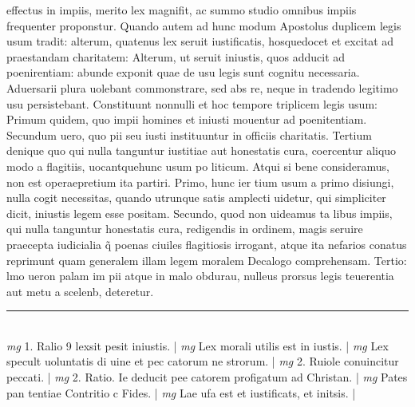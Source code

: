 \documentclass{article}
\begin{document}
\begin{pages}
effectus in impiis, merito lex magnifit, ac summo studio omnibus impiis frequenter proponstur. Quando autem ad hunc modum Apostolus duplicem legis usum tradit: alterum, quatenus lex seruit iustificatis, hosquedocet et excitat ad praestandam charitatem: Alterum, ut seruit iniustis, quos adducit ad poenirentiam: abunde exponit quae de usu legis sunt cognitu necessaria. Aduersarii plura uolebant commonstrare, sed abs re, neque  in tradendo legitimo usu persistebant. Constituunt nonnulli et hoc tempore triplicem legis usum: Primum quidem, quo impii homines et iniusti mouentur ad poenitentiam. Secundum uero, quo pii seu iusti instituuntur in officiis charitatis. Tertium denique  quo qui nulla tanguntur iustitiae aut honestatis cura, coercentur aliquo modo a flagitiis, uocantquehunc usum po liticum. Atqui si bene consideramus, non est operaepretium ita partiri. Primo, hunc ier tium usum a primo disiungi, nulla cogit necessitas, quando utrunque  satis amplecti uidetur, qui simpliciter dicit, iniustis legem esse positam. Secundo, quod non uideamus ta libus impiis, qui nulla tanguntur honestatis cura, redigendis in ordinem, magis seruire praecepta iudicialia q̃ poenas ciuiles flagitiosis irrogant, atque  ita nefarios conatus reprimunt quam generalem illam legem moralem Decalogo comprehensam. Tertio: lmo ueron palam im pii atque  in malo obdurau, nulleus prorsus legis teuerentia aut metu a scelenb, deteretur.  \pend
\vspace{0.5cm}\noindent
\vspace{0.2cm}\rule{1cm}{0.2pt}\\ 
\hspace{0.2cm}\textit{mg}
\footnotesize 1. Ralio 9 lexsit pesit iniustis. 
\normalsize| 
\hspace{0.2cm}\textit{mg}
\footnotesize Lex morali utilis est in iustis. 
\normalsize| 
\hspace{0.2cm}\textit{mg}
\footnotesize Lex specult uoluntatis di uine et pec catorum ne strorum. 
\normalsize| 
\hspace{0.2cm}\textit{mg}
\footnotesize 2. Ruiole conuincitur peccati. 
\normalsize| 
\hspace{0.2cm}\textit{mg}
\footnotesize 2. Ratio. Ie deducit pee catorem profigatum ad Christan. 
\normalsize| 
\hspace{0.2cm}\textit{mg}
\footnotesize Pates pan tentiae Contritio c Fides. 
\normalsize| 
\hspace{0.2cm}\textit{mg}
\footnotesize Lae ufa est et iustificats, et initsis. 
\normalsize| 

\end{pages}
\end{document}
